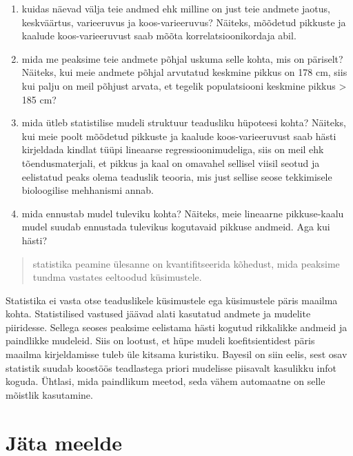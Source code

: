 \documentclass[]{book}
\begin{document}
\begin{enumerate}
\def\labelenumi{\arabic{enumi})}
\item
  kuidas näevad välja teie andmed ehk milline on just teie andmete
  jaotus, keskväärtus, varieeruvus ja koos-varieeruvus? Näiteks,
  mõõdetud pikkuste ja kaalude koos-varieeruvust saab mõõta
  korrelatsioonikordaja abil.
\item
  mida me peaksime teie andmete põhjal uskuma selle kohta, mis on
  päriselt? Näiteks, kui meie andmete põhjal arvutatud keskmine pikkus
  on 178 cm, siis kui palju on meil põhjust arvata, et tegelik
  populatsiooni keskmine pikkus \textgreater{} 185 cm?
\item
  mida ütleb statistilise mudeli struktuur teadusliku hüpoteesi kohta?
  Näiteks, kui meie poolt mõõdetud pikkuste ja kaalude koos-varieeruvust
  saab hästi kirjeldada kindlat tüüpi lineaarse regressioonimudeliga,
  siis on meil ehk tõendusmaterjali, et pikkus ja kaal on omavahel
  sellisel viisil seotud ja eelistatud peaks olema teaduslik teooria,
  mis just sellise seose tekkimisele bioloogilise mehhanismi annab.
\item
  mida ennustab mudel tuleviku kohta? Näiteks, meie lineaarne
  pikkuse-kaalu mudel suudab ennustada tulevikus kogutavaid pikkuse
  andmeid. Aga kui hästi?
\end{enumerate}

\begin{quote}
statistika peamine ülesanne on kvantifitseerida kõhedust, mida peaksime
tundma vastates eeltoodud küsimustele.
\end{quote}

Statistika ei vasta otse teaduslikele küsimustele ega küsimustele päris
maailma kohta. Statistilised vastused jäävad alati kasutatud andmete ja
mudelite piiridesse. Sellega seoses peaksime eelistama hästi kogutud
rikkalikke andmeid ja paindlikke mudeleid. Siis on lootust, et hüpe
mudeli koefitsientidest päris maailma kirjeldamisse tuleb üle kitsama
kuristiku. Bayesil on siin eelis, sest osav statistik suudab koostöös
teadlastega priori mudelisse piisavalt kasulikku infot koguda. Ühtlasi,
mida paindlikum meetod, seda vähem automaatne on selle mõistlik
kasutamine.

\section*{Jäta meelde}\label{jata-meelde}
\end{document}

